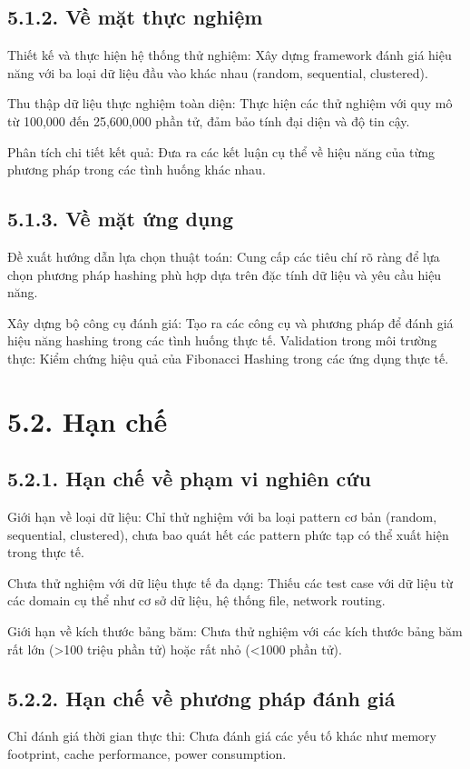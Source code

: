 \documentclass[12pt,a4paper]{report}
\begin{document}
\subsection*{5.1.2. Về mặt thực nghiệm}
\noindent \indent Thiết kế và thực hiện hệ thống thử nghiệm: Xây dựng framework đánh giá hiệu năng với ba loại dữ liệu đầu vào khác nhau (random, sequential, clustered).

Thu thập dữ liệu thực nghiệm toàn diện: Thực hiện các thử nghiệm với quy mô từ 100,000 đến 25,600,000 phần tử, đảm bảo tính đại diện và độ tin cậy.

Phân tích chi tiết kết quả: Đưa ra các kết luận cụ thể về hiệu năng của từng phương pháp trong các tình huống khác nhau.

\subsection*{5.1.3. Về mặt ứng dụng}
\noindent \indent Đề xuất hướng dẫn lựa chọn thuật toán: Cung cấp các tiêu chí rõ ràng để lựa chọn phương pháp hashing phù hợp dựa trên đặc tính dữ liệu và yêu cầu hiệu năng.

Xây dựng bộ công cụ đánh giá: Tạo ra các công cụ và phương pháp để đánh giá hiệu năng hashing trong các tình huống thực tế.
Validation trong môi trường thực: Kiểm chứng hiệu quả của Fibonacci Hashing trong các ứng dụng thực tế.

\section*{5.2. Hạn chế}
\subsection*{5.2.1. Hạn chế về phạm vi nghiên cứu}
\noindent \indent Giới hạn về loại dữ liệu: Chỉ thử nghiệm với ba loại pattern cơ bản (random, sequential, clustered), chưa bao quát hết các pattern phức tạp có thể xuất hiện trong thực tế.

Chưa thử nghiệm với dữ liệu thực tế đa dạng: Thiếu các test case với dữ liệu từ các domain cụ thể như cơ sở dữ liệu, hệ thống file, network routing.

Giới hạn về kích thước bảng băm: Chưa thử nghiệm với các kích thước bảng băm rất lớn (>100 triệu phần tử) hoặc rất nhỏ (<1000 phần tử).

\subsection*{5.2.2. Hạn chế về phương pháp đánh giá}
\noindent \indent Chỉ đánh giá thời gian thực thi: Chưa đánh giá các yếu tố khác như memory footprint, cache performance, power consumption.
\end{document}
